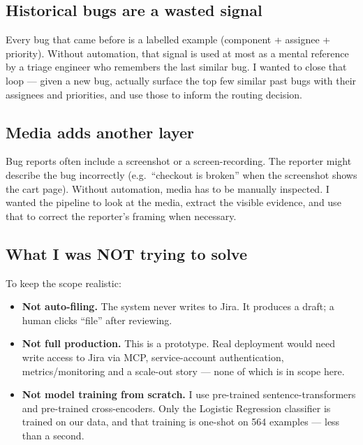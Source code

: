 \documentclass[11pt,a4paper]{article}
\begin{document}
\subsection{Historical bugs are a wasted signal}

Every bug that came before is a labelled example (component + assignee +
priority). Without automation, that signal is used at most as a mental
reference by a triage engineer who remembers the last similar bug. I wanted
to close that loop --- given a new bug, actually surface the top few similar
past bugs with their assignees and priorities, and use those to inform the
routing decision.

\subsection{Media adds another layer}

Bug reports often include a screenshot or a screen-recording. The reporter
might describe the bug incorrectly (e.g.\ ``checkout is broken'' when the
screenshot shows the cart page). Without automation, media has to be
manually inspected. I wanted the pipeline to look at the media, extract the
visible evidence, and use that to correct the reporter's framing when
necessary.

\subsection{What I was NOT trying to solve}

To keep the scope realistic:

\begin{itemize}[leftmargin=1.2em,nosep]
\item \textbf{Not auto-filing.} The system never writes to Jira. It produces
      a draft; a human clicks ``file'' after reviewing.
\item \textbf{Not full production.} This is a prototype. Real deployment
      would need write access to Jira via MCP, service-account authentication,
      metrics/monitoring and a scale-out story --- none of which is in scope
      here.
\item \textbf{Not model training from scratch.} I use pre-trained
      sentence-transformers and pre-trained cross-encoders. Only the
      Logistic Regression classifier is trained on our data, and that
      training is one-shot on 564 examples --- less than a second.
\end{itemize}

\newpage
\end{document}
